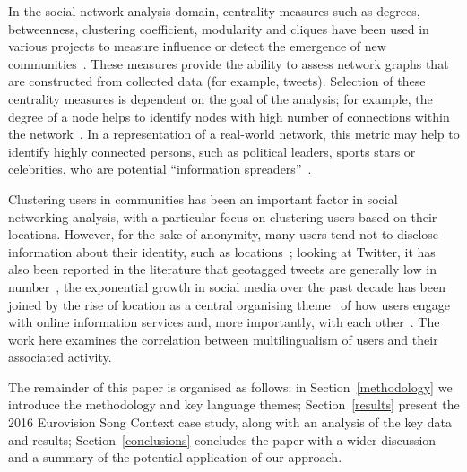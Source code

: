 \documentclass{llncs}
\begin{document}
In the social network analysis domain, centrality measures such as
degrees, betweenness, clustering coefficient, modularity and cliques
have been used in various projects to measure influence or detect the
emergence of new
communities~\cite{willis-et-al:2015,oatley+crick:2015}.  These
measures provide the ability to assess network graphs that are
constructed from collected data (for example, tweets). Selection of
these centrality measures is dependent on the goal of the analysis;
for example, the degree of a node helps to identify nodes with high
number of connections within the
network~\cite{borgatti+everett:2000,rombach-et-al:2014,liu-et-al:2014}.
In a representation of a real-world network, this metric may help to
identify highly connected persons, such as political leaders, sports
stars or celebrities, who are potential ``information
spreaders''~\cite{cha-et-al:2012,borge-holthoefer-et-al:2012,zhang-et-al:2016}.

Clustering users in communities has been an important factor in social
networking analysis, with a particular focus on clustering users
based on their locations. However, for the sake of anonymity, many
users tend not to disclose information about their identity, such as
locations~\cite{kang-et-al:2013}; looking at Twitter, it has also been
reported in the literature that geotagged tweets are generally low in
number~\cite{morstatter-et-al:2013,tan-et-al:2013,kumar-et-al:2014},
the exponential growth in social media over the past decade has been
joined by the rise of location as a central organising
theme~\cite{liang-et-al:2013} of how users engage with online
information services and, more importantly, with each
other~\cite{cheng-et-al:2010,blamey-et-al-2013,caverlee-et-al:2013}. The work here
examines the correlation between multilingualism of users and their
associated activity.


The remainder of this paper is organised as follows: in
Section~\ref{methodology} we introduce the methodology and key
language themes; Section~\ref{results} present the 2016 Eurovision
Song Context case study, along with an analysis of the key data and
results; Section~\ref{conclusions} concludes the paper with a wider
discussion and a summary of the potential application of our approach.
\end{document}
